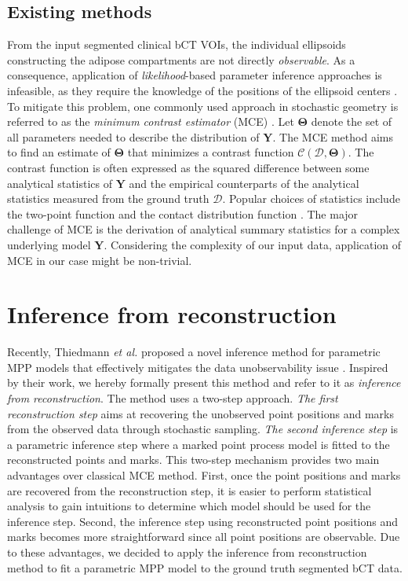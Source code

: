 \documentclass[journal]{IEEEtran}
\begin{document}
\subsection{Existing methods}
\label{sec:exist-param-infer}

From the input segmented clinical bCT VOIs, the individual ellipsoids
constructing the adipose compartments are not directly
\textit{observable}. As a consequence, application of
\textit{likelihood}-based parameter inference approaches
\cite{moller2003statistical} is infeasible, as they require the
knowledge of the positions of the ellipsoid centers
\cite{dereudre2014estimation}. To mitigate this problem, one commonly
used approach in stochastic geometry is referred to as the
\textit{minimum contrast estimator} (MCE)
\cite{chiu2013stochastic}. Let $\mathbf{\Theta}$ denote the set of all
parameters needed to describe the distribution of $\mathbf{Y}$. The
MCE method aims to find an estimate of $\mathbf{\Theta}$ that
minimizes a contrast function
$\mathcal{C}(\mathcal{D}, \mathbf{\Theta})$. The contrast function is
often expressed as the squared difference between some analytical
statistics of $\mathbf{Y}$ and the empirical counterparts of the
analytical statistics measured from the ground truth
$\mathcal{D}$. Popular choices of statistics include the two-point
function \cite{diggle1981binary} and the contact distribution function
\cite {heinrich1993asymptotic}. The major challenge of MCE is the
derivation of analytical summary statistics for a complex underlying
model $\mathbf{Y}$. Considering the complexity of our input data,
application of MCE in our case might be non-trivial.

\section{Inference from reconstruction}
\label{sec:meth-infer-from}

Recently, Thiedmann \textit{et al.} proposed a novel inference method
for parametric MPP models that effectively mitigates the data
unobservability issue \cite{thiedmann2011stochastic}. Inspired by
their work, we hereby formally present this method and refer to it as
\textit{inference from reconstruction}. The method uses a two-step
approach. \textit{The first reconstruction step} aims at recovering
the unobserved point positions and marks from the observed data
through stochastic sampling. \textit{The second inference step} is a
parametric inference step where a marked point process model is fitted
to the reconstructed points and marks. This two-step mechanism
provides two main advantages over classical MCE method. First, once
the point positions and marks are recovered from the reconstruction
step, it is easier to perform statistical analysis to gain intuitions
to determine which model should be used for the inference
step. Second, the inference step using reconstructed point positions
and marks becomes more straightforward since all point positions are
observable. Due to these advantages, we decided to apply the inference
from reconstruction method to fit a parametric MPP model to the ground
truth segmented bCT data.
\end{document}
